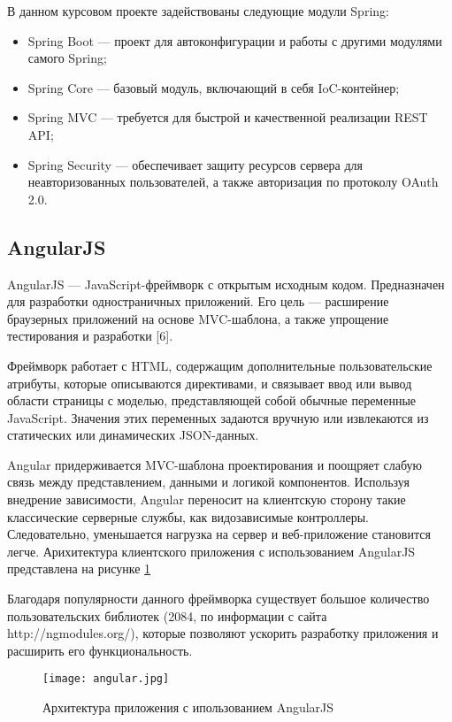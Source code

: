 В данном курсовом проекте задействованы следующие модули Spring:
\begin{itemize}
  \item Spring Boot --- проект для автоконфигурации и работы с другими модулями самого Spring;
  \item Spring Core --- базовый модуль, включающий в себя IoC-контейнер;
  \item Spring MVC --- требуется для быстрой и качественной реализации REST API;
  \item Spring Security --- обеспечивает защиту ресурсов сервера для неавторизованных пользователей, а также
  авторизация по протоколу OAuth 2.0.
\end{itemize}

\subsection{AngularJS}
\label{sec:angular}

AngularJS --- JavaScript-фреймворк с открытым исходным кодом. Предназначен для разработки одностраничных приложений. 
Его цель --- расширение браузерных приложений на основе MVC-шаблона, а также упрощение тестирования и разработки [6].

Фреймворк работает с HTML, содержащим дополнительные пользовательские атрибуты, которые описываются директивами, 
и связывает ввод или вывод области страницы с моделью, представляющей собой обычные переменные JavaScript. 
Значения этих переменных задаются вручную или извлекаются из статических или динамических JSON-данных.

Angular придерживается MVC-шаблона проектирования и поощряет слабую связь между представлением, данными и логикой 
компонентов. Используя внедрение зависимости, Angular переносит на клиентскую сторону такие классические серверные 
службы, как видозависимые контроллеры. Следовательно, уменьшается нагрузка на сервер и веб-приложение становится легче. 
Арихитектура клиентского приложения с использованием AngularJS представлена на рисунке \ref{fig:angular}

Благодаря популярности данного фреймворка существует большое количество пользовательских библиотек (2084, по информации с 
сайта \\ http://ngmodules.org/), которые позволяют ускорить разработку приложения и расширить его функциональность.

\clearpage

\begin{figure}[h!] 
  \centering  
  \texttt{[image: angular.jpg]}
  \caption{Архитектура приложения с ипользованием AngularJS}
  \label{fig:angular}
\end{figure}